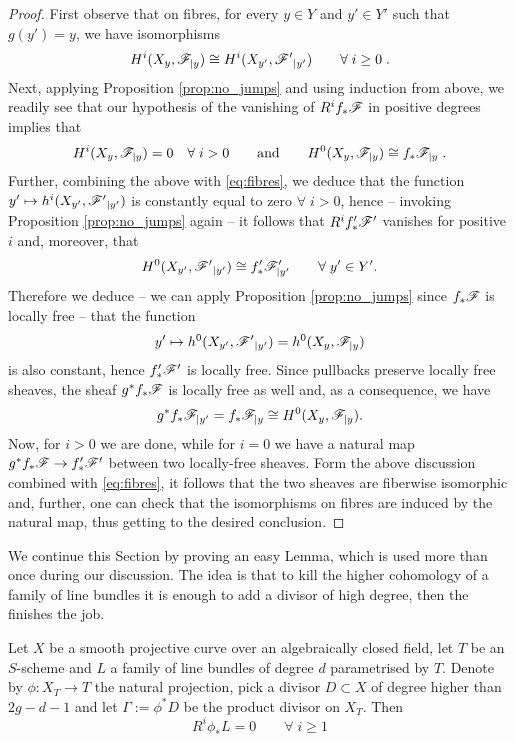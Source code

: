 	\begin{proof}
		First observe that on fibres, for every $y\in Y$ and $y'\in Y'$ such that $g(y')=y$, we have isomorphisms
		\begin{equation}\label{eq:fibres}
			H^i(X_y, \mathscr{F}_{\mid y}) \cong H^i(X_{y'}, \mathscr{F'}_{\mid y'}) \qquad \forall\; i\geq 0\;.
		\end{equation}
		Next, applying Proposition \ref{prop:no_jumps} and using induction from above, we readily see that our hypothesis of the vanishing of $R^if_*\mathscr{F}$ in positive degrees implies that
		$$ 
		H^i(X_y, \mathscr{F}_{\mid y}) = 0 \quad \forall\;i>0 
		\qquad \text{and} \qquad 
		H^0(X_y, \mathscr{F}_{\mid y}) \cong f_* \mathscr{F}_{\mid y} \;.
		$$ 
		Further, combining the above with \eqref{eq:fibres}, we deduce that the function $y'\mapsto h^i(X_{y'}, \mathscr{F'}_{\mid y'})$ is constantly equal to zero $\forall\; i>0$, hence -- invoking Proposition \ref{prop:no_jumps} again -- it follows that $R^i f_*' \mathscr{F}'$ vanishes for positive $i$ and, moreover, that
		$$ H^0(X_{y'}, \mathscr{F'}_{\mid y'}) \cong f_*'\mathscr{F}'_{\mid y'} \qquad \forall\; y' \in Y'. $$
		Therefore we deduce -- we can apply Proposition \ref{prop:no_jumps} since $f_*\mathscr{F}$ is locally free -- that the function
		$$ y'\mapsto h^0(X_{y'}, \mathscr{F'}_{\mid y'}) = h^0(X_y, \mathscr{F}_{\mid y}) $$
		is also constant, hence $f_*'\mathscr{F}'$ is locally free. Since pullbacks preserve locally free sheaves, the sheaf $g^* f_*\mathscr{F}$ is locally free as well and, as a consequence, we have
		$$ g^* f_* \mathscr{F}_{\mid y'} = f_* \mathscr{F}_{\mid y} \cong H^0(X_y, \mathscr{F}_{\mid y}). $$ 
		Now, for $i>0$ we are done, while for $i=0$ we have a natural map $g^* f_* \mathscr{F} \to f'_*\mathscr{F}'$ between two locally-free sheaves. Form the above discussion combined with \eqref{eq:fibres}, it follows that the two sheaves are fiberwise isomorphic and, further, one can check that the isomorphisms on fibres are induced by the natural map, thus getting to the desired conclusion.
	\end{proof}
	\vspace{1em}
	We continue this Section by proving an easy Lemma, which is used more than once during our discussion. The idea is that to kill the higher cohomology of a family of line bundles it is enough to add a divisor of high degree, then the \RR finishes the job.
	\begin{lemm}\label{lemm:trivial_R1}
		Let $X$ be a smooth projective curve over an algebraically closed field, let $T$ be an $S$-scheme and $L$ a family of line bundles of degree $d$ parametrised by $T$. Denote by $\phi:X_T\to T$ the natural projection, pick a divisor $D\subset X$ of degree higher than $2g-d-1$ and let $\Gamma := \phi^* D$ be the product divisor on $X_T$. Then
		$$ R^i\phi_* L = 0 \qquad \forall \;i \geq 1 $$
	\end{lemm}
